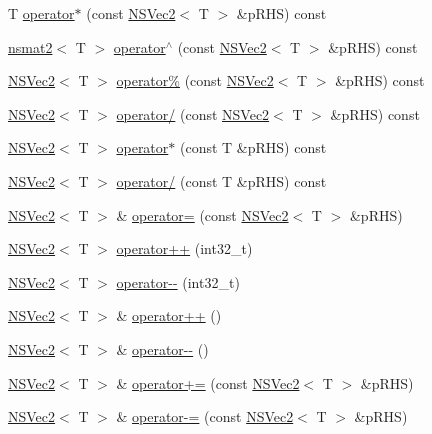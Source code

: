\begin{DoxyCompactItemize}
\item 
T \hyperlink{structNSVec2_a47ab82793314ed9b1e13a78a327902af}{operator$\ast$} (const \hyperlink{structNSVec2}{N\-S\-Vec2}$<$ T $>$ \&p\-R\-H\-S) const 
\item 
\hyperlink{structnsmat2}{nsmat2}$<$ T $>$ \hyperlink{structNSVec2_a21f9591c61c58e2b5d37c0d3e5b69302}{operator$^\wedge$} (const \hyperlink{structNSVec2}{N\-S\-Vec2}$<$ T $>$ \&p\-R\-H\-S) const 
\item 
\hyperlink{structNSVec2}{N\-S\-Vec2}$<$ T $>$ \hyperlink{structNSVec2_abdc55cbf9c95c8c46a1213f9f4dd9164}{operator\%} (const \hyperlink{structNSVec2}{N\-S\-Vec2}$<$ T $>$ \&p\-R\-H\-S) const 
\item 
\hyperlink{structNSVec2}{N\-S\-Vec2}$<$ T $>$ \hyperlink{structNSVec2_acb0366c62152a3c1b5a6d7e018cad9d6}{operator/} (const \hyperlink{structNSVec2}{N\-S\-Vec2}$<$ T $>$ \&p\-R\-H\-S) const 
\item 
\hyperlink{structNSVec2}{N\-S\-Vec2}$<$ T $>$ \hyperlink{structNSVec2_a9584269d3067b9baf01d7500a1a641a6}{operator$\ast$} (const T \&p\-R\-H\-S) const 
\item 
\hyperlink{structNSVec2}{N\-S\-Vec2}$<$ T $>$ \hyperlink{structNSVec2_a93ce6359617f9a2d7fdd1d5ff3ae62cf}{operator/} (const T \&p\-R\-H\-S) const 
\item 
\hyperlink{structNSVec2}{N\-S\-Vec2}$<$ T $>$ \& \hyperlink{structNSVec2_a6399d750b8d9a373762e3dce8bfb943a}{operator=} (const \hyperlink{structNSVec2}{N\-S\-Vec2}$<$ T $>$ \&p\-R\-H\-S)
\item 
\hyperlink{structNSVec2}{N\-S\-Vec2}$<$ T $>$ \hyperlink{structNSVec2_a4599911fe243c1e7e81e8ccdf97913d3}{operator++} (int32\-\_\-t)
\item 
\hyperlink{structNSVec2}{N\-S\-Vec2}$<$ T $>$ \hyperlink{structNSVec2_aa7833b46f6d1fb9feeb3f79c9e582431}{operator-\/-\/} (int32\-\_\-t)
\item 
\hyperlink{structNSVec2}{N\-S\-Vec2}$<$ T $>$ \& \hyperlink{structNSVec2_a80a6a43fa38869dfa89c9ed45d90c247}{operator++} ()
\item 
\hyperlink{structNSVec2}{N\-S\-Vec2}$<$ T $>$ \& \hyperlink{structNSVec2_ac529f71951fe42af4da77a198955e6f6}{operator-\/-\/} ()
\item 
\hyperlink{structNSVec2}{N\-S\-Vec2}$<$ T $>$ \& \hyperlink{structNSVec2_ab375c44939c79798866806dfa39da8b6}{operator+=} (const \hyperlink{structNSVec2}{N\-S\-Vec2}$<$ T $>$ \&p\-R\-H\-S)
\item 
\hyperlink{structNSVec2}{N\-S\-Vec2}$<$ T $>$ \& \hyperlink{structNSVec2_acc56f1bfbd2d25559628b4ae82d9eaea}{operator-\/=} (const \hyperlink{structNSVec2}{N\-S\-Vec2}$<$ T $>$ \&p\-R\-H\-S)

\end{DoxyCompactItemize}
